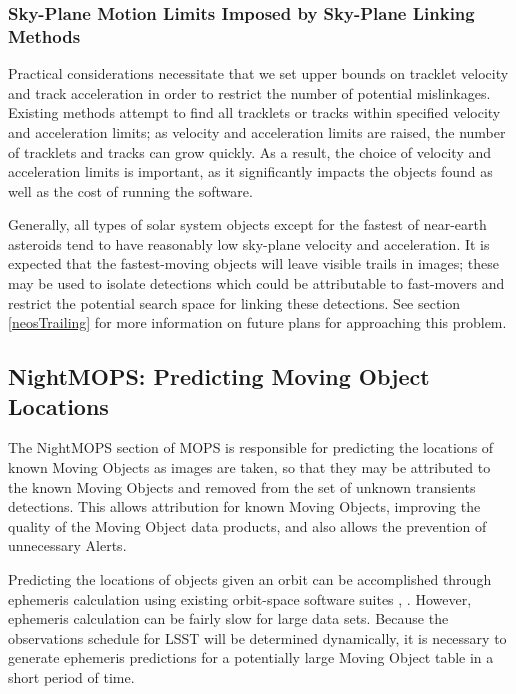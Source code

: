 \documentclass[12pt,preprint]{aastex}
\begin{document}
\subsubsection{Sky-Plane Motion Limits Imposed by Sky-Plane Linking Methods}

Practical considerations necessitate that we set upper bounds on
tracklet velocity and track acceleration in order to restrict the
number of potential mislinkages. Existing methods attempt to find all
tracklets or tracks within specified velocity and acceleration limits;
as velocity and acceleration limits are raised, the number of
tracklets and tracks can grow quickly.  As a result, the choice of
velocity and acceleration limits is important, as it significantly
impacts the objects found as well as the cost of running the software.

Generally, all types of solar system objects except for the fastest of
near-earth asteroids tend to have reasonably low sky-plane velocity
and acceleration. It is expected that the fastest-moving objects will
leave visible trails in images; these may be used to isolate
detections which could be attributable to fast-movers and restrict the
potential search space for linking these detections.  See section
\ref{neosTrailing} for more information on future plans for
approaching this problem.  





\subsection{NightMOPS: Predicting Moving Object Locations}

The NightMOPS section of MOPS is responsible for predicting the
locations of known Moving Objects as images are taken, so that they
may be attributed to the known Moving Objects and removed from the set
of unknown transients detections.  This allows attribution for known
Moving Objects, improving the quality of the Moving Object data
products, and also allows the prevention of unnecessary Alerts.

Predicting the locations of objects given an orbit can be accomplished
through ephemeris calculation using existing orbit-space software
suites \citep{Milani2006}, \citep{OpenOrb2009}.  However, ephemeris
calculation can be fairly slow for large data sets.  Because the
observations schedule for LSST will be determined dynamically, it is
necessary to generate ephemeris predictions for a potentially large
Moving Object table in a short period of time.
\end{document}
